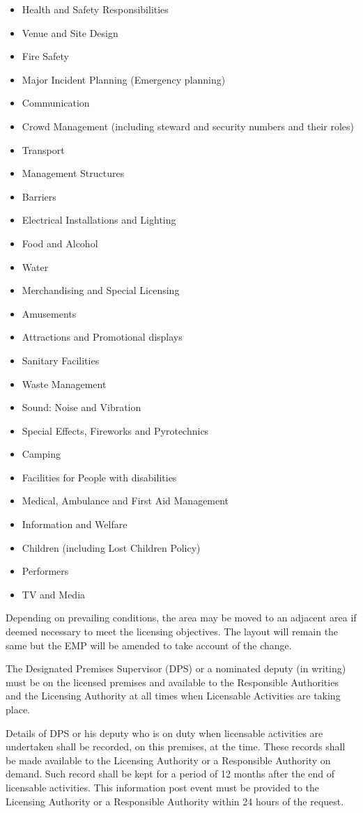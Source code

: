 \begin{itemize}
\tightlist
\item Health and Safety Responsibilities
\item Venue and Site Design
\item Fire Safety
\item Major Incident Planning (Emergency planning)
\item Communication
\item Crowd Management (including steward and security numbers and their roles)
\item Transport
\item Management Structures
\item Barriers
\item Electrical Installations and Lighting
\item Food and Alcohol
\item Water
\item Merchandising and Special Licensing
\item Amusements
\item Attractions and Promotional displays
\item Sanitary Facilities
\item Waste Management
\item Sound: Noise and Vibration
\item Special Effects, Fireworks and Pyrotechnics
\item Camping
\item Facilities for People with disabilities
\item Medical, Ambulance and First Aid Management
\item Information and Welfare
\item Children (including Lost Children Policy)
\item Performers
\item TV and Media
\end{itemize}

Depending on prevailing conditions, the area may be moved to an adjacent
area if deemed necessary to meet the licensing objectives. The layout
will remain the same but the EMP will be amended to take account of the
change.

The Designated Premises Supervisor (DPS) or a nominated deputy (in writing) must be
on the licensed premises and available to the Responsible Authorities
and the Licensing Authority at all times when Licensable Activities are
taking place.

Details of DPS or his deputy who
is on duty when licensable activities are undertaken shall be recorded,
on this premises, at the time. These records shall be made available to the
Licensing Authority or a Responsible Authority on demand. Such record
shall be kept for a period of 12 months after the end of licensable
activities. This information post event must be provided to the
Licensing Authority or a Responsible Authority within 24 hours of the
request.

